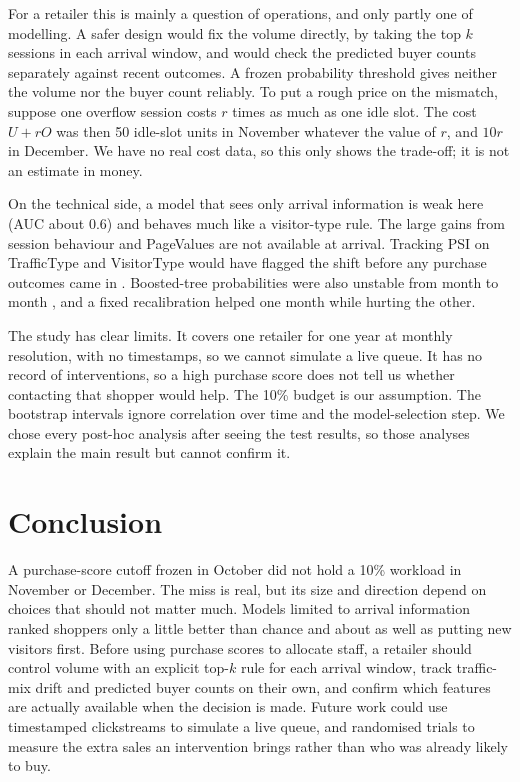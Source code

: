\documentclass[conference]{IEEEtran}
\begin{document}
For a retailer this is mainly a question of operations, and only partly one of modelling. A safer
design would fix the volume directly, by taking the top $k$ sessions in each arrival window, and would
check the predicted buyer counts separately against recent outcomes. A frozen probability threshold
gives neither the volume nor the buyer count reliably. To put a rough price on the mismatch, suppose
one overflow session costs $r$ times as much as one idle slot. The cost $U+rO$ was then 50 idle-slot
units in November whatever the value of $r$, and $10r$ in December. We have no real cost data, so this
only shows the trade-off; it is not an estimate in money.

On the technical side, a model that sees only arrival information is weak here (AUC about 0.6) and
behaves much like a visitor-type rule. The large gains from session behaviour and PageValues are not
available at arrival. Tracking PSI on TrafficType and VisitorType would have flagged the shift before
any purchase outcomes came in \cite{b8}. Boosted-tree probabilities were also unstable from month to month
\cite{b13}, and a fixed recalibration helped one month while hurting the other.

The study has clear limits. It covers one retailer for one year at monthly resolution, with no
timestamps, so we cannot simulate a live queue. It has no record of interventions, so a high purchase
score does not tell us whether contacting that shopper would help. The 10\% budget is our assumption.
The bootstrap intervals ignore correlation over time and the model-selection step. We chose every
post-hoc analysis after seeing the test results, so those analyses explain the main result but cannot
confirm it.

\section{Conclusion}
A purchase-score cutoff frozen in October did not hold a 10\% workload in November or December. The miss
is real, but its size and direction depend on choices that should not matter much. Models limited to
arrival information ranked shoppers only a little better than chance and about as well as putting new
visitors first. Before using purchase scores to allocate staff, a retailer should control volume with an
explicit top-$k$ rule for each arrival window, track traffic-mix drift and predicted buyer counts on their
own, and confirm which features are actually available when the decision is made. Future work could use
timestamped clickstreams to simulate a live queue, and randomised trials to measure the extra sales an
intervention brings rather than who was already likely to buy.
\end{document}
